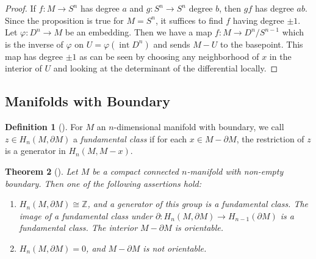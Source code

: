 \documentclass[reqno]{amsart}
\newtheorem{theorem}{Theorem}[section]
\theoremstyle{definition}
\newtheorem{definition}[theorem]{Definition}
\theoremstyle{remark}
\DeclareMathOperator{\Int}{int}
\begin{document}
\begin{proof}
    If $f \colon M \to S^{n}$ has degree
    $a$ and $g \colon S^{n} \to S^{n}$ degree $b$, then
    $gf$ has degree $ab$. Since the proposition is true
    for $M = S^{n}$, it suffices to find $f$ having
    degree $\pm 1$. Let
    $\varphi  \colon D^{n} \to M$ be an embedding. Then
    we have a map $f \colon M \to D^{n} / S^{n-1}$ which is
    the inverse of $\varphi $ on $U = \varphi 
    \left( \Int D^{n} \right) $ and
    sends $M - U$ to the basepoint. This map has degree
    $\pm 1$ as can be seen
    by choosing any neighborhood of
    $x$ in the interior of $U$ and looking at the
    determinant of the differential locally.
\end{proof}

\subsection{Manifolds with Boundary}

\begin{definition}[]
    For $M$ an $n$-dimensional manifold with boundary, we
    call $z \in H_n \left( M, \partial M \right) $ a 
    \textit{fundamental class} if for each $x \in 
    M - \partial M$, the restriction of $z$ is a generator
    in $H_n \left( M, M - x \right) $.
\end{definition}

\begin{theorem}[]\label{Thm:XOGJWQ}
    Let $M$ be a compact connected $n$-manifold with non-empty
    boundary. Then one of the following assertions hold:
    \begin{enumerate}
        \item $H_n \left( M, \partial M \right) \cong \mathbb{Z}$,
            and a generator of this group is a fundamental
            class. The image of a fundamental class under
            $\partial \colon H_n \left( M, \partial M \right) 
            \to H_{n-1} \left( \partial M \right) $ is
            a fundamental class. The interior $M - \partial M$ 
            is orientable.
        \item $H_n \left( M , \partial M \right) = 0$, and
            $M - \partial M$ is not orientable.
    \end{enumerate}
\end{theorem}
\end{document}

